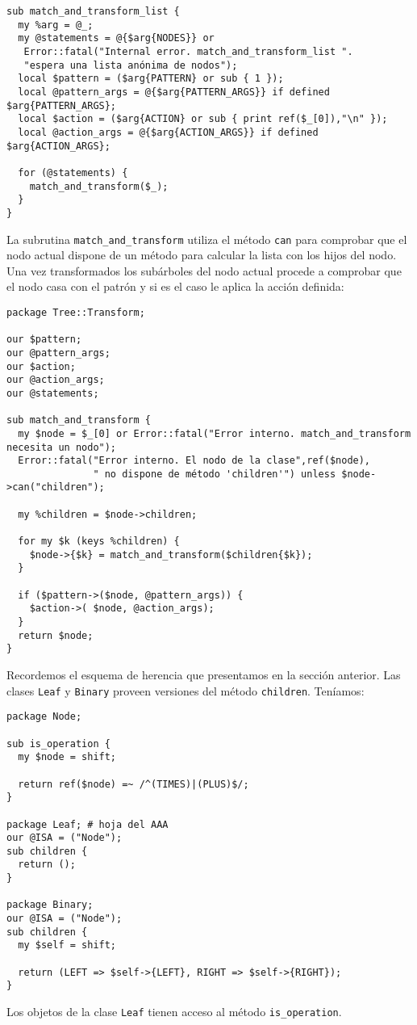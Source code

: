 \begin{verbatim}
sub match_and_transform_list {
  my %arg = @_;
  my @statements = @{$arg{NODES}} or 
   Error::fatal("Internal error. match_and_transform_list ".
   "espera una lista anónima de nodos");
  local $pattern = ($arg{PATTERN} or sub { 1 });
  local @pattern_args = @{$arg{PATTERN_ARGS}} if defined $arg{PATTERN_ARGS};
  local $action = ($arg{ACTION} or sub { print ref($_[0]),"\n" }); 
  local @action_args = @{$arg{ACTION_ARGS}} if defined $arg{ACTION_ARGS};

  for (@statements) {
    match_and_transform($_);
  }
}
\end{verbatim}

La subrutina \verb|match_and_transform|
utiliza el método \verb|can| para comprobar que el 
nodo actual dispone de un método
para calcular la lista con los hijos del nodo.
Una vez transformados los subárboles del nodo actual
procede a comprobar que el nodo casa con el patrón
y si es el caso le aplica la acción definida:

\begin{verbatim}
package Tree::Transform;

our $pattern;
our @pattern_args;
our $action;
our @action_args;
our @statements;

sub match_and_transform {
  my $node = $_[0] or Error::fatal("Error interno. match_and_transform necesita un nodo");
  Error::fatal("Error interno. El nodo de la clase",ref($node),
               " no dispone de método 'children'") unless $node->can("children");
  
  my %children = $node->children;

  for my $k (keys %children) {
    $node->{$k} = match_and_transform($children{$k});
  }

  if ($pattern->($node, @pattern_args)) {
    $action->( $node, @action_args); 
  }
  return $node;
}
\end{verbatim}

Recordemos el esquema de herencia que presentamos en la sección anterior.
Las clases \verb|Leaf| y \verb|Binary| proveen versiones del método \verb|children|.
Teníamos:
\begin{verbatim}
package Node;

sub is_operation {
  my $node = shift;

  return ref($node) =~ /^(TIMES)|(PLUS)$/;
}

package Leaf; # hoja del AAA
our @ISA = ("Node");
sub children {
  return ();
}

package Binary;
our @ISA = ("Node");
sub children {
  my $self = shift;

  return (LEFT => $self->{LEFT}, RIGHT => $self->{RIGHT});
}
\end{verbatim}
Los objetos de la clase \verb|Leaf| tienen acceso 
al método \verb|is_operation|.

